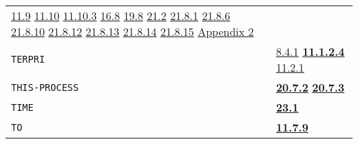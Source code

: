 \documentclass[a4paper]{scrbook}
\begin{document}
\begin{longtable}[]{@{}ll@{}}
\begin{minipage}[t]{0.70\columnwidth}
\href{11-input-output.md\#119-internal-channels}{11.9}
\href{11-input-output.md\#1110-the-net-device-the-arpa-network}{11.10} \href{11-input-output.md\#11103-nets}{11.10.3}
\href{16-errors-frames-etc.md\#168-control-s-s}{16.8} \href{19-compiled-programs.md\#198-rsubrs-in-files}{19.8}
\href{21-interrupts.md\#212-event}{21.2} \href{21-interrupts.md\#2181-char-received}{21.8.1}
\href{21-interrupts.md\#2186-clock}{21.8.6} \href{21-interrupts.md\#21810-sysdown}{21.8.10}
\href{21-interrupts.md\#21812-ipc}{21.8.12} \href{21-interrupts.md\#21813-inferior}{21.8.13}
\href{21-interrupts.md\#21814-runt-and-realt}{21.8.14} \href{21-interrupts.md\#21815-dangerous-interrupts}{21.8.15}
\href{appendix-2-predefined-subroutines.md\#appendix-2-predefined-subroutines}{Appendix 2}\strut
\end{minipage}\tabularnewline
\begin{minipage}[t]{0.24\columnwidth}\raggedright\strut
\texttt{TERPRI}\strut
\end{minipage} & \begin{minipage}[t]{0.70\columnwidth}\raggedright\strut
\href{08-truth.md\#841-and-and-or-as-short-conds}{8.4.1} \textbf{\href{11-input-output.md\#11124-terpri}{11.1.2.4}}
\href{11-input-output.md\#1121-open}{11.2.1}\strut
\end{minipage}\tabularnewline
\begin{minipage}[t]{0.24\columnwidth}\raggedright\strut
\texttt{THIS-PROCESS}\strut
\end{minipage} & \begin{minipage}[t]{0.70\columnwidth}\raggedright\strut
\textbf{\href{20-coroutines.md\#2072-main}{20.7.2}} \textbf{\href{20-coroutines.md\#2073-me}{20.7.3}}\strut
\end{minipage}\tabularnewline
\begin{minipage}[t]{0.24\columnwidth}\raggedright\strut
\texttt{TIME}\strut
\end{minipage} & \begin{minipage}[t]{0.70\columnwidth}\raggedright\strut
\textbf{\href{23-mdl-as-a-system-process.md\#231-time}{23.1}}\strut
\end{minipage}\tabularnewline
\begin{minipage}[t]{0.24\columnwidth}\raggedright\strut
\texttt{TO}\strut
\end{minipage} & \begin{minipage}[t]{0.70\columnwidth}\raggedright\strut
\textbf{\href{11-input-output.md\#1179-rename}{11.7.9}}\strut
\end{minipage}\tabularnewline

\end{longtable}
\end{document}
